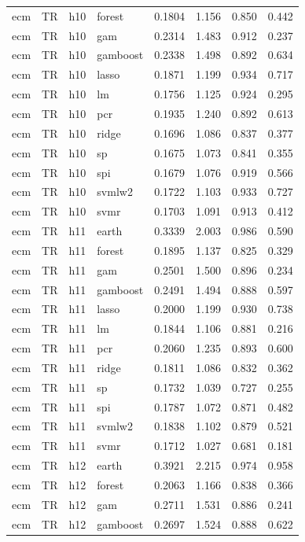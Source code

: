 \begin{ThreePartTable}
\begin{longtable}[t]{llclcccc}
ecm & TR & h10 & forest & 0.1804 & 1.156 & 0.850 & 0.442\\
ecm & TR & h10 & gam & 0.2314 & 1.483 & 0.912 & 0.237\\
ecm & TR & h10 & gamboost & 0.2338 & 1.498 & 0.892 & 0.634\\
ecm & TR & h10 & lasso & 0.1871 & 1.199 & 0.934 & 0.717\\
ecm & TR & h10 & lm & 0.1756 & 1.125 & 0.924 & 0.295\\
ecm & TR & h10 & pcr & 0.1935 & 1.240 & 0.892 & 0.613\\
ecm & TR & h10 & ridge & 0.1696 & 1.086 & 0.837 & 0.377\\
ecm & TR & h10 & sp & 0.1675 & 1.073 & 0.841 & 0.355\\
ecm & TR & h10 & spi & 0.1679 & 1.076 & 0.919 & 0.566\\
ecm & TR & h10 & svmlw2 & 0.1722 & 1.103 & 0.933 & 0.727\\
ecm & TR & h10 & svmr & 0.1703 & 1.091 & 0.913 & 0.412\\
\addlinespace
ecm & TR & h11 & earth & 0.3339 & 2.003 & 0.986 & 0.590\\
ecm & TR & h11 & forest & 0.1895 & 1.137 & 0.825 & 0.329\\
ecm & TR & h11 & gam & 0.2501 & 1.500 & 0.896 & 0.234\\
ecm & TR & h11 & gamboost & 0.2491 & 1.494 & 0.888 & 0.597\\
ecm & TR & h11 & lasso & 0.2000 & 1.199 & 0.930 & 0.738\\
ecm & TR & h11 & lm & 0.1844 & 1.106 & 0.881 & 0.216\\
ecm & TR & h11 & pcr & 0.2060 & 1.235 & 0.893 & 0.600\\
ecm & TR & h11 & ridge & 0.1811 & 1.086 & 0.832 & 0.362\\
ecm & TR & h11 & sp & 0.1732 & 1.039 & 0.727 & 0.255\\
ecm & TR & h11 & spi & 0.1787 & 1.072 & 0.871 & 0.482\\
ecm & TR & h11 & svmlw2 & 0.1838 & 1.102 & 0.879 & 0.521\\
ecm & TR & h11 & svmr & 0.1712 & 1.027 & 0.681 & 0.181\\
\addlinespace
ecm & TR & h12 & earth & 0.3921 & 2.215 & 0.974 & 0.958\\
ecm & TR & h12 & forest & 0.2063 & 1.166 & 0.838 & 0.366\\
ecm & TR & h12 & gam & 0.2711 & 1.531 & 0.886 & 0.241\\
ecm & TR & h12 & gamboost & 0.2697 & 1.524 & 0.888 & 0.622\\

\end{longtable}
\end{ThreePartTable}
